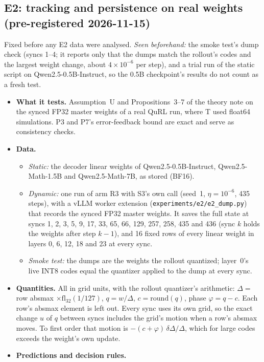 \documentclass[11pt]{article}
\begin{document}
\subsection{E2: tracking and persistence on real weights (pre-registered 2026-11-15)}\label{sec:e2}
Fixed before any E2 data were analysed. \emph{Seen beforehand:} the smoke test's dump check (syncs 1--4; it reports only that the dumps match the rollout's codes and the largest weight change, about $4\times10^{-6}$ per step), and a trial run of the static script on Qwen2.5-0.5B-Instruct, so the 0.5B checkpoint's results do not count as a fresh test.
\begin{itemize}
\item \textbf{What it tests.} Assumption~U and Propositions~3--7 of the theory note on the synced FP32 master weights of a real QuRL run, where T used float64 simulations. P3 and P7's error-feedback bound are exact and serve as consistency checks.
\item \textbf{Data.}
  \begin{itemize}
  \item \emph{Static:} the decoder linear weights of Qwen2.5-0.5B-Instruct, Qwen2.5-Math-1.5B and Qwen2.5-Math-7B, as stored (BF16).
  \item \emph{Dynamic:} one run of arm R3 with S3's own call (seed~1, $\eta=10^{-6}$, 435 steps), with a vLLM worker extension (\texttt{experiments/e2/e2\_dump.py}) that records the synced FP32 master weights. It saves the full state at syncs 1, 2, 3, 5, 9, 17, 33, 65, 66, 129, 257, 258, 435 and 436 (sync $k$ holds the weights after step $k-1$), and 16 fixed rows of every linear weight in layers 0, 6, 12, 18 and 23 at every sync.
  \item \emph{Smoke test:} the dumps are the weights the rollout quantized; layer~0's live INT8 codes equal the quantizer applied to the dump at every sync.
  \end{itemize}
\item \textbf{Quantities.} All in grid units, with the rollout quantizer's arithmetic: $\Delta=$ row absmax $\times\mathrm{fl}_{32}(1/127)$, $q=w/\Delta$, $c=\mathrm{round}(q)$, phase $\varphi=q-c$. Each row's absmax element is left out. Every sync uses its own grid, so the exact change $u$ of $q$ between syncs includes the grid's motion when a row's absmax moves. To first order that motion is $-(c+\varphi)\,\delta\Delta/\Delta$, which for large codes exceeds the weight's own update.
\item \textbf{Predictions and decision rules.}


\end{itemize}
\end{document}
